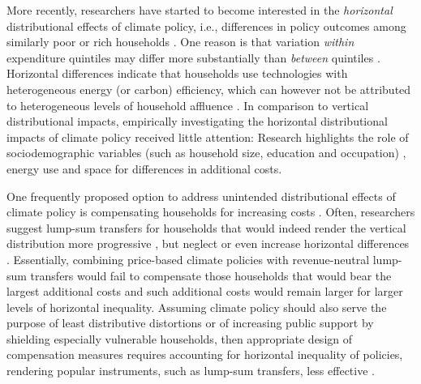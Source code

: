 \documentclass[12pt, a4paper]{article}
\begin{document}
More recently, researchers have started to become interested in the \textit{horizontal} distributional effects of climate policy, i.e., differences in policy outcomes among similarly poor or rich households \autocite{Rausch.2011,Fischer.2019}. One reason is that variation \textit{within} expenditure quintiles may differ more substantially than \textit{between} quintiles \autocite{Cronin.2019,Steckel.2021b,Pizer.2019}. Horizontal differences indicate that households use technologies with heterogeneous energy (or carbon) efficiency, which can however not be attributed to heterogeneous levels of household affluence \autocite{Hansel.2022}. In comparison to vertical distributional impacts, empirically investigating the horizontal distributional impacts of climate policy received little attention: Research highlights the role of sociodemographic variables (such as household size, education and occupation) \autocite{Grainger.2010,Buchs.2013,Farrell.2017,Missbach.2023}, energy use \autocite{Steckel.2021b,Missbach.2024} and space \autocite{Chan.2023,Burtraw.2009} for differences in additional costs.

One frequently proposed option to address unintended distributional effects of climate policy is compensating households for increasing costs \autocite{Klenert.2018,Baranzini.2017}. Often, researchers suggest lump-sum transfers for households that would indeed render the vertical distribution more progressive \autocite{Budolfson.2021,Steckel.2021b,vanderPloeg.2022}, but neglect or even increase horizontal differences \autocite{Cronin.2019,Hansel.2022}. Essentially, combining price-based climate policies with revenue-neutral lump-sum transfers would fail to compensate those households that would bear the largest additional costs and such additional costs would remain larger for larger levels of horizontal inequality. Assuming climate policy should also serve the purpose of least distributive distortions \autocite{Fischer.2019} or of increasing public support by shielding especially vulnerable households, then appropriate design of compensation measures requires accounting for horizontal inequality of policies, rendering popular instruments, such as lump-sum transfers, less effective \autocite{Missbach.2024}. 
\end{document}
